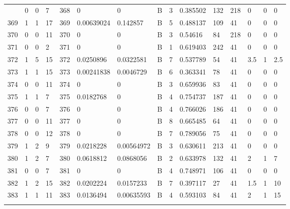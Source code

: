 \begin{latin}
\begin{longtable}{lllllllllllllll}
\begin{comment}
	368 & 0  & 0   & 7  & 368 & 0              & 0              & B & 3  & 0.385502 & 132  & 218  & 0       & 0       & 0       \\
	369 & 1  & 1   & 17 & 369 & 0.00639024     & 0.142857       & B & 5  & 0.488137 & 109  & 41   & 0       & 0       & 0       \\
	370 & 0  & 0   & 11 & 370 & 0              & 0              & B & 3  & 0.54616  & 84   & 218  & 0       & 0       & 0       \\
	371 & 0  & 0   & 2  & 371 & 0              & 0              & B & 1  & 0.619403 & 242  & 41   & 0       & 0       & 0       \\
	372 & 1  & 5   & 15 & 372 & 0.0250896      & 0.0322581      & B & 7  & 0.537789 & 54   & 41   & 3.5     & 1       & 2.5     \\
	373 & 1  & 1   & 15 & 373 & 0.00241838     & 0.0046729      & B & 6  & 0.363341 & 78   & 41   & 0       & 0       & 0       \\
	374 & 0  & 0   & 11 & 374 & 0              & 0              & B & 3  & 0.659936 & 83   & 41   & 0       & 0       & 0       \\
	375 & 1  & 1   & 7  & 375 & 0.0182768      & 0              & B & 4  & 0.754737 & 187  & 41   & 0       & 0       & 0       \\
	376 & 0  & 0   & 7  & 376 & 0              & 0              & B & 4  & 0.766026 & 186  & 41   & 0       & 0       & 0       \\
	377 & 0  & 0   & 11 & 377 & 0              & 0              & B & 8  & 0.665485 & 64   & 41   & 0       & 0       & 0       \\
	378 & 0  & 0   & 12 & 378 & 0              & 0              & B & 7  & 0.789056 & 75   & 41   & 0       & 0       & 0       \\
	379 & 1  & 2   & 9  & 379 & 0.0218228      & 0.00564972     & B & 3  & 0.630611 & 213  & 41   & 0       & 0       & 0       \\
	380 & 1  & 2   & 7  & 380 & 0.0618812      & 0.0868056      & B & 2  & 0.633978 & 132  & 41   & 2       & 1       & 7       \\
	381 & 0  & 0   & 7  & 381 & 0              & 0              & B & 4  & 0.748971 & 106  & 41   & 0       & 0       & 0       \\
	382 & 1  & 2   & 15 & 382 & 0.0202224      & 0.0157233      & B & 7  & 0.397117 & 27   & 41   & 1.5     & 1       & 10      \\
	383 & 1  & 1   & 11 & 383 & 0.0136494      & 0.00635593     & B & 4  & 0.593103 & 84   & 41   & 2       & 1       & 15      \\

\end{comment}
\end{longtable}
\end{latin}
